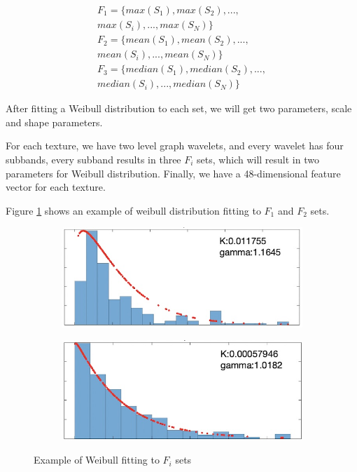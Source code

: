 \documentclass[conference]{IEEEtran}
\begin{document}
\begin{equation}
\begin{multlined}
F_1=\{ max(S_1),max(S_2),...,\\max(S_i),...,max(S_N)\}\\
F_2=\{ mean(S_1),mean(S_2),...,\\mean(S_i),...,mean(S_N)\}\\
F_3=\{ median(S_1),median(S_2),...,\\median(S_i),...,median(S_N)\}
\end{multlined}
\end{equation}

After fitting a Weibull distribution to each set, we will get two parameters, scale and shape parameters.

For each texture, we have two level graph wavelets, and every wavelet has four subbands, every subband results in three $F_i$ sets, which will result in two parameters for Weibull distribution. Finally, we have a 48-dimensional feature vector for each texture.


Figure \ref{fig:weibull_fit} shows an example of weibull distribution fitting to $F_1$ and $F_2$ sets.
\begin{figure}[tbh]
  \centering
  \begin{subfigure}{0.24\textwidth}
    \centering
    \includegraphics[width=\linewidth]{weibull1.jpg}
    \caption{}
  \end{subfigure}
  \hfill
  \begin{subfigure}{0.24\textwidth}
    \centering
    \includegraphics[width=\linewidth]{weibull2.jpg}
    \caption{}
  \end{subfigure}
  \caption{Example of Weibull fitting to $F_i$ sets}
  \label{fig:weibull_fit}
\end{figure}
\end{document}
